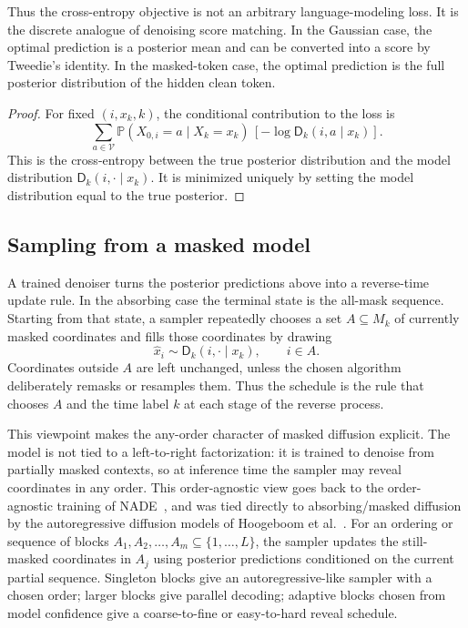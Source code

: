\documentclass[10pt,a4paper]{amsart}
\numberwithin{equation}{section}
\newcommand{\Pp}{\mathbb{P}}
\newcommand{\mc}[1]{\mathcal{#1}}
\newcommand{\wh}[1]{\widehat{#1}}
\newcommand{\denoiser}{\mathsf{D}}
\begin{document}
Thus the cross-entropy objective is not an arbitrary language-modeling loss.
It is the discrete analogue of denoising score matching.  In the Gaussian case,
the optimal prediction is a posterior mean and can be converted into a score by
Tweedie's identity.  In the masked-token case, the optimal prediction is the
full posterior distribution of the hidden clean token.

\begin{proof}
For fixed $(i,x_k,k)$, the conditional contribution to the loss is
\[
    \sum_{a\in\mc{V}}
    \Pp(X_{0,i}=a\mid X_k=x_k)\,[-\log \denoiser_k(i,a\mid x_k)].
\]
This is the cross-entropy between the true posterior distribution and the
model distribution $\denoiser_k(i,\cdot\mid x_k)$.  It is minimized uniquely by
setting the model distribution equal to the true posterior.
\end{proof}

\subsection{Sampling from a masked model}
\label{subsec:masked-sampling}

A trained denoiser turns the posterior predictions above into a reverse-time
update rule.  In the absorbing case the terminal state is the all-mask
sequence.  Starting from that state, a sampler repeatedly chooses a set
$A\subseteq M_k$ of currently masked coordinates and fills those coordinates by
drawing
\[
    \wh x_i\sim \denoiser_k(i,\cdot\mid x_k),
    \qquad i\in A.
\]
Coordinates outside $A$ are left unchanged, unless the chosen algorithm
deliberately remasks or resamples them.  Thus the schedule is the rule that
chooses $A$ and the time label $k$ at each stage of the reverse process.

This viewpoint makes the any-order character of masked diffusion explicit.  The
model is not tied to a left-to-right factorization: it is trained to denoise
from partially masked contexts, so at inference time the sampler may reveal
coordinates in any order.  This order-agnostic view goes back to the
order-agnostic training of NADE~\cite{uria2014nade}, and was tied directly to
absorbing/masked diffusion by the autoregressive diffusion models of Hoogeboom
et al.~\cite{hoogeboom2022ardm}.  For an ordering or sequence of blocks
$A_1,A_2,\ldots,A_m\subseteq\{1,\ldots,L\}$, the sampler updates the
still-masked coordinates in $A_j$ using posterior predictions conditioned on
the current partial sequence.  Singleton blocks give an autoregressive-like
sampler with a chosen order; larger blocks give parallel decoding; adaptive
blocks chosen from model confidence give a coarse-to-fine or easy-to-hard
reveal schedule.
\end{document}
